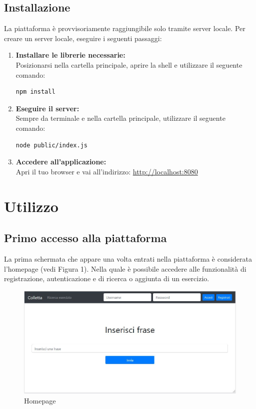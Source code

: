 \documentclass[11pt,a4paper]{article}
\begin{document}
{	\subsection{Installazione}
	La piattaforma è provvisoriamente raggiungibile solo tramite server locale.
	Per creare un server locale, eseguire i seguenti passaggi:
	 \begin{enumerate}
	 	\item \textbf{Installare le librerie necessarie:}\\ Posizionarsi nella cartella principale, aprire la shell e utilizzare il seguente comando:\begin{lstlisting}[numbers=none]
	 	npm install
	 	\end{lstlisting}
	 	\item \textbf{Eseguire il server:}\\ Sempre da terminale e nella cartella principale, utilizzare il seguente comando:\begin{lstlisting}[numbers=none]
	 	node public/index.js
	 	\end{lstlisting}
	 	\item \textbf{Accedere all'applicazione:}\\ Apri il tuo browser e vai all'indirizzo: \url{http://localhost:8080}
	 \end{enumerate}
 
 \newpage
	\section{Utilizzo}	
	
	\subsection{Primo accesso alla piattaforma}
	La prima schermata che appare una volta entrati nella piattaforma è considerata l'homepage (vedi Figura 1). Nella quale è possibile accedere alle funzionalità di registrazione, autenticazione e di ricerca o aggiunta di un esercizio.
	
	\begin{figure}[h]
		\centering
		\includegraphics[scale=0.65]{images/home.jpg}
		\caption{Homepage}
	\end{figure}
	
}
\end{document}
